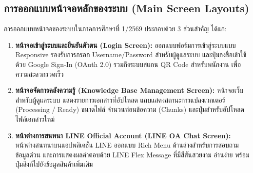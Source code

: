 \subsection{การออกแบบหน้าจอหลักของระบบ (Main Screen Layouts)}
\hspace*{1.3em}
การออกแบบหน้าจอของระบบในภาคการศึกษาที่ 1/2569 ประกอบด้วย 3 ส่วนสำคัญ ได้แก่:
\begin{enumerate}[leftmargin=3.5em]
\item \textbf{หน้าจอเข้าสู่ระบบและยืนยันตัวตน (Login Screen):} ออกแบบฟอร์มการเข้าสู่ระบบแบบ Responsive รองรับการกรอก Username/Password สำหรับผู้ดูแลระบบ และปุ่มลงชื่อเข้าใช้ด้วย Google Sign-In (OAuth 2.0) รวมถึงระบบสแกน QR Code สำหรับพนักงาน เพื่อความสะดวกรวดเร็ว
\item \textbf{หน้าจอจัดการคลังความรู้ (Knowledge Base Management Screen):} หน้าจอเว็บสำหรับผู้ดูแลระบบ แสดงรายการเอกสารที่อัปโหลด แถบแสดงสถานะการแปลงเวกเตอร์ (Processing / Ready) ขนาดไฟล์ จำนวนท่อนข้อความ (Chunks) และปุ่มสำหรับอัปโหลดไฟล์เอกสารใหม่
\item \textbf{หน้าต่างการสนทนา LINE Official Account (LINE OA Chat Screen):} หน้าต่างสนทนาบนแอปพลิเคชัน LINE ออกแบบ Rich Menu ด้านล่างสำหรับการสอบถามข้อมูลด่วน และการแสดงผลคำตอบด้วย LINE Flex Message ที่มีสีสันสวยงาม อ่านง่าย พร้อมปุ่มลิงก์ไปยังข้อมูลสินค้าเพิ่มเติม
\end{enumerate}
